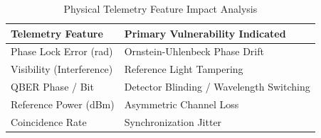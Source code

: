 \begin{table}[htbp]
\centering
\caption{Physical Telemetry Feature Impact Analysis}
\label{tab:telemetry_features}
\begin{tabular}{@{}p{4.5cm}p{4cm}@{}}
\toprule
\textbf{Telemetry Feature} & \textbf{Primary Vulnerability Indicated} \\ \midrule
Phase Lock Error (rad) & Ornstein-Uhlenbeck Phase Drift \\
Visibility (Interference) & Reference Light Tampering \\
QBER Phase / Bit & Detector Blinding / Wavelength Switching \\
Reference Power (dBm) & Asymmetric Channel Loss \\
Coincidence Rate & Synchronization Jitter \\
\bottomrule
\end{tabular}
\end{table}
